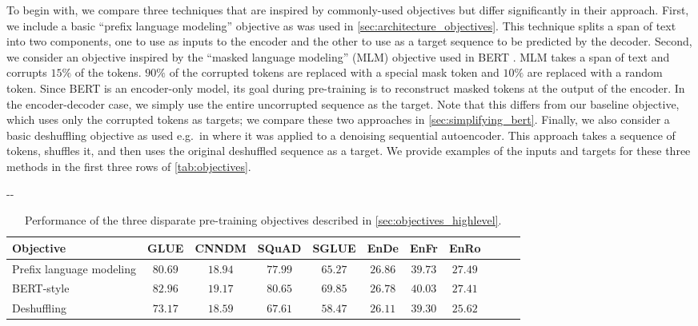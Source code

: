\documentclass[twoside,11pt]{article}
\newlength{\offsetpage}
\newenvironment{widepage}{\begin{adjustwidth}{-\offsetpage}{-\offsetpage}
    \addtolength{\textwidth}{2\offsetpage}}
{\end{adjustwidth}}
\def\*#1{\mathbf{#1}}
\begin{document}
To begin with, we compare three techniques that are inspired by commonly-used objectives but differ significantly in their approach.
First, we include a basic ``prefix language modeling'' objective as was used in \cref{sec:architecture_objectives}.
This technique splits a span of text into two components, one to use as inputs to the encoder and the other to use as a target sequence to be predicted by the decoder.
Second, we consider an objective inspired by the ``masked language modeling'' (MLM) objective used in BERT \citep{devlin2018bert}.
MLM takes a span of text and corrupts $15\%$ of the tokens.
$90\%$ of the corrupted tokens are replaced with a special mask token and $10\%$ are replaced with a random token.
Since BERT is an encoder-only model, its goal during pre-training is to reconstruct masked tokens at the output of the encoder.
In the encoder-decoder case, we simply use the entire uncorrupted sequence as the target.
Note that this differs from our baseline objective, which uses only the corrupted tokens as targets; we compare these two approaches in \cref{sec:simplifying_bert}.
Finally, we also consider a basic deshuffling objective as used e.g.\ in \citep{liu2019summae} where it was applied to a denoising sequential autoencoder.
This approach takes a sequence of tokens, shuffles it, and then uses the original deshuffled sequence as a target.
We provide examples of the inputs and targets for these three methods in the first three rows of \cref{tab:objectives}.

\begin{table}
\footnotesize
\begin{widepage}
\centering
\begin{tabular}{l c c c c c c c c c c}
\toprule
    Objective                         & GLUE        & CNNDM       & SQuAD       & SGLUE       & EnDe        & EnFr        & EnRo        \\
\midrule
    Prefix language modeling          & $80.69$     & $18.94$     & $77.99$     & $65.27$     & $\*{26.86}$ & $39.73$     & $\*{27.49}$ \\
    BERT-style \citep{devlin2018bert} & $\*{82.96}$ & $\*{19.17}$ & $\*{80.65}$ & $\*{69.85}$ & $\*{26.78}$ & $\*{40.03}$ & $\*{27.41}$ \\
    Deshuffling                       & $73.17$     & $18.59$     & $67.61$     & $58.47$     & $26.11$     & $39.30$     & $25.62$ \\
\bottomrule
\end{tabular}
\end{widepage}
\caption{
Performance of the three disparate pre-training objectives described in \cref{sec:objectives_highlevel}.
}
\label{tab:objectives_highlevel}
\end{table}
\end{document}
